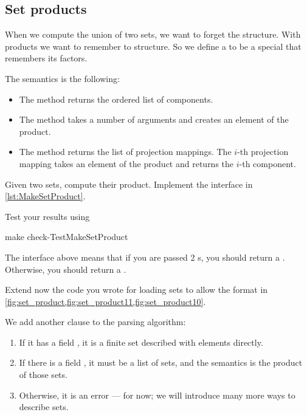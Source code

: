 \subsection{Set products}

When we compute the union of two sets, we want to forget the structure. With products we want to remember to structure.
So we define a  to be a special \Setoid that remembers its factors.



The semantics is the following:
\begin{itemize}
  \item The method  returns the ordered list of components.
  \item The method  takes a number of arguments and creates an element of the product.
  \item The method  returns the list of projection mappings.
  The $i$-th projection mapping takes an element of the product and returns the $i$-th component.

\end{itemize}


\begin{codeexercise}
  Given two sets, compute their product. Implement the interface in \cref{lst:MakeSetProduct}.

  Test your results using

  \begin{console}
    make check-TestMakeSetProduct
  \end{console}

\end{codeexercise}



The interface above means that if you are passed 2 \FiniteSet{}s, you should return a \FiniteSet.
Otherwise, you should return a \Setoid.



%

%

Extend now the code you wrote for loading sets to allow the format in \cref{fig:set_product,fig:set_product11,fig:set_product10}.

We add another clause to the parsing algorithm:
\begin{enumerate}
  \item If it has a field , it is a finite set described with elements directly.
  \item If there is a field , it must be a list of sets, and the semantics is the product of those sets.
  \item Otherwise, it is an error --- for now; we will introduce many more ways to describe sets.
\end{enumerate}


